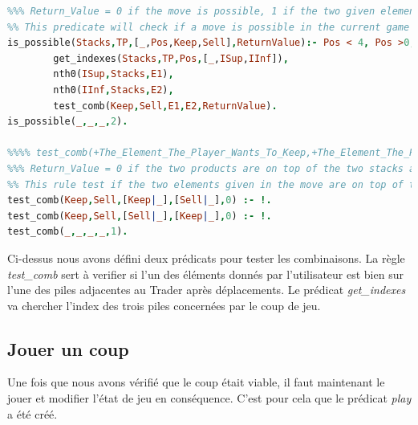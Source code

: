 \documentclass[a4paper, 11pt,twoside, leqno]{report}
\theoremstyle{plain}
\begin{document}
\begin{lstlisting}[language=prolog]
%%%% is_possible(+List_Of_Stacks,+Current_Trader_Position,+Move_The_Player_Wants_To_Make,?Return_Value)
%%% Return_Value = 0 if the move is possible, 1 if the two given element are not on the two stacks adjacent ot the Trader position, 2 if the move applied to the Trader is not in [1,2,3].
%% This predicate will check if a move is possible in the current game configuration.
is_possible(Stacks,TP,[_,Pos,Keep,Sell],ReturnValue):- Pos < 4, Pos >0, !,
		get_indexes(Stacks,TP,Pos,[_,ISup,IInf]),
		nth0(ISup,Stacks,E1),
		nth0(IInf,Stacks,E2),
		test_comb(Keep,Sell,E1,E2,ReturnValue).
is_possible(_,_,_,2).

%%%% test_comb(+The_Element_The_Player_Wants_To_Keep,+The_Element_The_Player_Wants_To_Sell,+One_Of_The_Adjacent_Stack,+The_Other_Adjacent_Stack,?The_Return_Value)
%%% Return_Value = 0 if the two products are on top of the two stacks adjacent to the Trader's position, = 1 otherwise.
%% This rule test if the two elements given in the move are on top of the two adjacent stacks of the Trader stack.
test_comb(Keep,Sell,[Keep|_],[Sell|_],0) :- !.
test_comb(Keep,Sell,[Sell|_],[Keep|_],0) :- !.
test_comb(_,_,_,_,1).
\end{lstlisting}

Ci-dessus nous avons défini deux prédicats pour tester les combinaisons. La règle \textit{test\_{}comb} sert à verifier si l'un des éléments donnés par l'utilisateur est bien sur l'une des piles adjacentes au Trader après déplacements. Le prédicat \textit{get\_{}indexes} va chercher l'index des trois piles concernées par le coup de jeu.

\subsection{Jouer un coup}
Une fois que nous avons vérifié que le coup était viable, il faut maintenant le jouer et modifier l'état de jeu en conséquence. C'est pour cela que le prédicat \textit{play} a été créé. 
\end{document}

